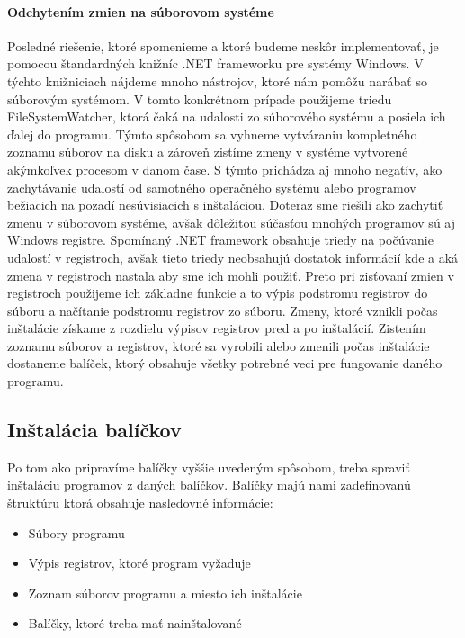 \paragraph{Odchytením zmien na súborovom systéme}
Posledné riešenie, ktoré spomenieme a ktoré budeme neskôr implementovať, je pomocou štandardných knižníc .NET frameworku pre systémy Windows. V týchto knižniciach nájdeme mnoho nástrojov, ktoré nám pomôžu narábať so súborovým systémom. V tomto konkrétnom prípade použijeme triedu FileSystemWatcher, ktorá čaká na udalosti zo súborového systému a posiela ich ďalej do programu. Týmto spôsobom sa vyhneme vytváraniu kompletného zoznamu súborov na disku a zároveň zistíme zmeny v systéme vytvorené akýmkoľvek procesom v danom čase. S týmto prichádza aj mnoho negatív, ako zachytávanie udalostí od samotného operačného systému alebo programov bežiacich na pozadí nesúvisiacich s inštaláciou. Doteraz sme riešili ako zachytiť zmenu v súborovom systéme, avšak dôležitou súčasťou mnohých programov sú aj Windows registre. Spomínaný .NET framework obsahuje triedy na počúvanie udalostí v registroch, avšak tieto triedy neobsahujú dostatok informácií kde a aká zmena v registroch nastala aby sme ich mohli použiť. Preto pri zisťovaní zmien v registroch použijeme ich základne funkcie a to výpis podstromu  registrov do súboru a načítanie podstromu registrov zo súboru. Zmeny, ktoré vznikli počas inštalácie získame z rozdielu výpisov registrov pred a po inštalácií. Zistením zoznamu súborov a registrov, ktoré sa vyrobili alebo zmenili počas inštalácie dostaneme balíček, ktorý obsahuje všetky potrebné veci pre fungovanie daného programu.

\subsection{Inštalácia balíčkov}

Po tom ako pripravíme balíčky vyššie uvedeným spôsobom, treba spraviť inštaláciu programov z daných balíčkov. Balíčky majú nami zadefinovanú štruktúru ktorá obsahuje nasledovné informácie:

\begin{itemize}
\item Súbory programu
\item Výpis registrov, ktoré program vyžaduje
\item Zoznam súborov programu a miesto ich inštalácie
\item Balíčky, ktoré treba mať nainštalované
\end{itemize}

